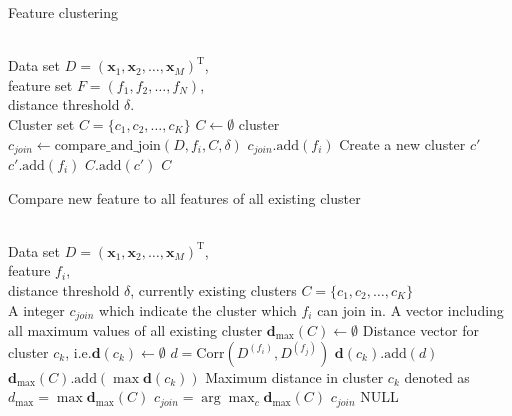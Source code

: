 \documentclass[journal]{IEEEtran}
\begin{document}
\begin{algorithm}
\caption{Feature clustering}
\label{alg:clustering}
\begin{algorithmic}[1]
\REQUIRE ~~\\
    Data set $D=(\bm{x}_1,\bm{x}_2,\ldots,\bm{x}_M)^\text{T}$, \\
    feature set $F=(f_1,f_2,\ldots,f_N)$, \\
    distance threshold $\delta$.
\ENSURE ~~\\
    Cluster set $C=\{c_1,c_2,\ldots,c_K\}$
\STATE $C \gets \emptyset$
        \STATE cluster $c_{join} \gets \text{compare\_and\_join}(D, f_i, C, \delta)$
            \STATE $c_{join}\text{.add}(f_i)$
        \ELSE
            \STATE Create a new cluster $c'$
            \STATE $c'\text{.add}(f_i)$
            \STATE $C\text{.add}(c')$
        \ENDIF
    \ENDIF
\ENDFOR
\RETURN $C$
\end{algorithmic}
\end{algorithm}

\begin{algorithm}
\caption{Compare new feature to all features of all existing cluster}
\label{alg:compare-and-join}
\begin{algorithmic}[1]
\REQUIRE ~~\\
    Data set $D=(\bm{x}_1,\bm{x}_2,\ldots,\bm{x}_M)^\text{T}$, \\
    feature $f_i$, \\
    distance threshold $\delta$,
    currently existing clusters $C=\{c_1, c_2, \ldots, c_K\}$
\ENSURE ~~\\
    A integer $c_{join}$ which indicate the cluster which $f_i$ can join in.  
\STATE A vector including all maximum values of all existing cluster $\bm{d}_{\max}(C) \gets \emptyset$
    \STATE Distance vector for cluster $c_k$, i.e.$\bm{d}(c_k) \gets \emptyset$
        \STATE $d=\text{Corr}(D^{(f_i)}, D^{(f_j)})$
        \STATE $\bm{d}(c_k)\text{.add}(d)$
    \ENDFOR
    \STATE $\bm{d}_{\max}(C)\text{.add}(\max{\bm{d}(c_k)})$
\ENDFOR
\STATE Maximum distance in cluster $c_k$ denoted as $d_{\max}=\max{\bm{d}_{\max}(C)}$
    \STATE $c_{join}=\arg\max_c{\bm{d}_{\max}(C)}$
    \RETURN $c_{join}$
\ELSE
    \RETURN NULL
\ENDIF
\end{algorithmic}
\end{algorithm}
\end{document}
